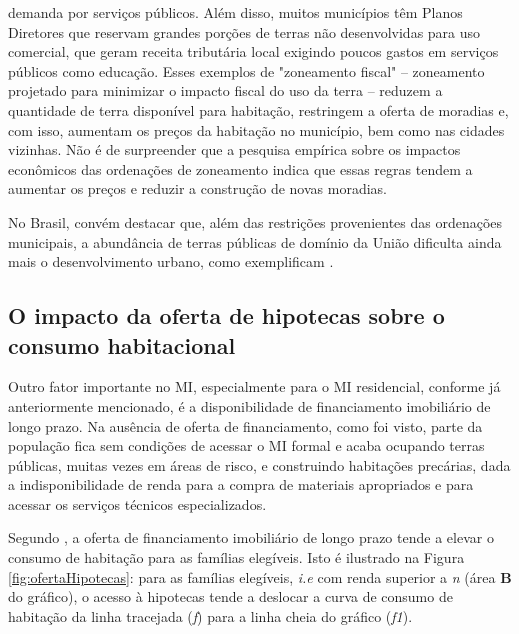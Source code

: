 \documentclass[
	12pt,				%
	oneside,			%
	a4paper,			%
	chapter=TITLE,		%
	section=TITLE,		%
	english,			%
	brazil				%
	]{abntex2}
\begin{document}
\begin{refsection}
\begin{citacao}
demanda por serviços públicos. Além disso, muitos municípios têm Planos
Diretores que reservam grandes porções de terras não desenvolvidas para uso
comercial, que geram receita tributária local exigindo poucos gastos em serviços
públicos como educação. Esses exemplos de "zoneamento fiscal" -- zoneamento
projetado para minimizar o impacto fiscal do uso da terra -- reduzem a
quantidade de terra disponível para habitação, restringem a oferta de moradias
e, com isso, aumentam os preços da habitação no município, bem como nas cidades
vizinhas. Não é de surpreender que a pesquisa empírica sobre os impactos
econômicos das ordenações de zoneamento indica que essas regras tendem a
aumentar os preços e reduzir a construção de novas moradias.
\cite[p. 206]{quigley}
\end{citacao}
No Brasil, convém destacar que, além das restrições provenientes das ordenações
municipais, a abundância de terras públicas de domínio da União dificulta ainda
mais o desenvolvimento urbano, como exemplificam \textcite{aragon}.

\hypertarget{o-impacto-da-oferta-de-hipotecas-sobre-o-consumo-habitacional}{%
\subsection{O impacto da oferta de hipotecas sobre o consumo habitacional}\label{o-impacto-da-oferta-de-hipotecas-sobre-o-consumo-habitacional}}

Outro fator importante no \gls{MI}, especialmente para o \gls{MI} residencial,
conforme já anteriormente mencionado, é a disponibilidade de financiamento
imobiliário de longo prazo. Na ausência de oferta de financiamento, como foi
visto, parte da população fica sem condições de acessar o \gls{MI} formal e
acaba ocupando terras públicas, muitas vezes em áreas de risco, e construindo
habitações precárias, dada a indisponibilidade de renda para a compra de
materiais apropriados e para acessar os serviços técnicos especializados.

Segundo \textcite[p.~254]{bertaud}, a oferta de financiamento imobiliário de
longo prazo tende a elevar o consumo de habitação para as famílias
elegíveis. Isto é ilustrado na Figura \ref{fig:ofertaHipotecas}: para as
famílias elegíveis, \emph{i.e} com renda superior a \emph{n} (área \textbf{B} do gráfico),
o acesso à hipotecas tende a deslocar a curva de consumo de habitação da linha
tracejada (\emph{f}) para a linha cheia do gráfico (\emph{f1}).
\begin{figure}[H]


\end{figure}
\end{refsection}
\end{document}
